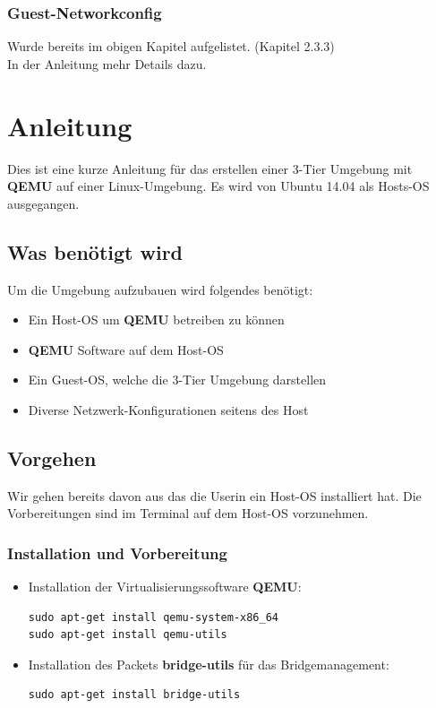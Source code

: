 \documentclass[a4,12pt]{scrartcl}
\begin{document}
\subsubsection{Guest-Networkconfig}
Wurde bereits im obigen Kapitel aufgelistet. (Kapitel 2.3.3)\\
In der Anleitung mehr Details dazu. 

\section{Anleitung}
Dies ist eine kurze Anleitung für das erstellen einer 3-Tier Umgebung mit \textbf{QEMU} auf einer Linux-Umgebung. Es wird von Ubuntu 14.04 als Hosts-OS ausgegangen.

\subsection{Was benötigt wird}
Um die Umgebung aufzubauen wird folgendes benötigt: 
\begin{itemize}
\item Ein Host-OS um \textbf{QEMU} betreiben zu können
\item \textbf{QEMU} Software auf dem Host-OS 
\item Ein Guest-OS, welche die 3-Tier Umgebung darstellen 
\item Diverse Netzwerk-Konfigurationen seitens des Host 
\end{itemize}

\subsection{Vorgehen}
Wir gehen bereits davon aus das die Userin ein Host-OS installiert hat.
Die Vorbereitungen sind im Terminal auf dem Host-OS vorzunehmen. 

\subsubsection{Installation und Vorbereitung}
\begin{itemize}
\item Installation der Virtualisierungssoftware \textbf{QEMU}:
\begin{lstlisting} 
sudo apt-get install qemu-system-x86_64
sudo apt-get install qemu-utils
\end{lstlisting}
\item Installation des Packets \textbf{bridge-utils} für das Bridgemanagement:
\begin{lstlisting}
sudo apt-get install bridge-utils
\end{lstlisting}
\end{itemize} 
\end{document}
